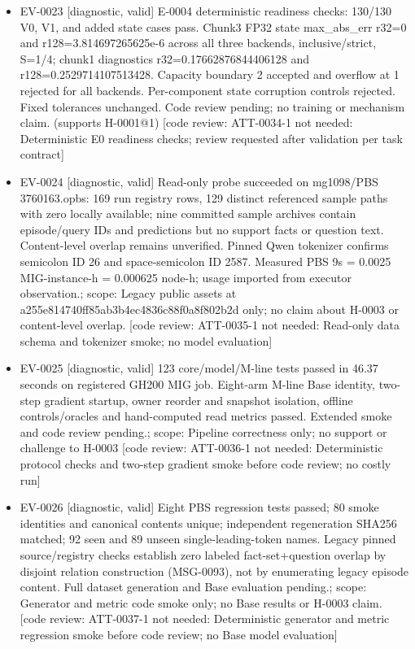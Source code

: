 \documentclass[11pt]{article}
\begin{document}
\begin{itemize}
\item EV-0023 [diagnostic, valid] E-0004 deterministic readiness checks: 130/130 V0, V1, and added state cases pass. Chunk3 FP32 state max\_abs\_err r32=0 and r128=3.814697265625e-6 across all three backends, inclusive/strict, S=1/4; chunk1 diagnostics r32=0.17662876844406128 and r128=0.2529714107513428. Capacity boundary 2 accepted and overflow at 1 rejected for all backends. Per-component state corruption controls rejected. Fixed tolerances unchanged. Code review pending; no training or mechanism claim. (supports H-0001@1) [code review: ATT-0034-1 not needed: Deterministic E0 readiness checks; review requested after validation per task contract]
\item EV-0024 [diagnostic, valid] Read-only probe succeeded on mg1098/PBS 3760163.opbs: 169 run registry rows, 129 distinct referenced sample paths with zero locally available; nine committed sample archives contain episode/query IDs and predictions but no support facts or question text. Content-level overlap remains unverified. Pinned Qwen tokenizer confirms semicolon ID 26 and space-semicolon ID 2587. Measured PBS 9s = 0.0025 MIG-instance-h = 0.000625 node-h; usage imported from executor observation.; scope: Legacy public assets at a255e814740ff85ab3b4ec4836c88f0a8f802b2d only; no claim about H-0003 or content-level overlap. [code review: ATT-0035-1 not needed: Read-only data schema and tokenizer smoke; no model evaluation]
\item EV-0025 [diagnostic, valid] 123 core/model/M-line tests passed in 46.37 seconds on registered GH200 MIG job. Eight-arm M-line Base identity, two-step gradient startup, owner reorder and snapshot isolation, offline controls/oracles and hand-computed read metrics passed. Extended smoke and code review pending.; scope: Pipeline correctness only; no support or challenge to H-0003 [code review: ATT-0036-1 not needed: Deterministic protocol checks and two-step gradient smoke before code review; no costly run]
\item EV-0026 [diagnostic, valid] Eight PBS regression tests passed; 80 smoke identities and canonical contents unique; independent regeneration SHA256 matched; 92 seen and 89 unseen single-leading-token names. Legacy pinned source/registry checks establish zero labeled fact-set+question overlap by disjoint relation construction (MSG-0093), not by enumerating legacy episode content. Full dataset generation and Base evaluation pending.; scope: Generator and metric code smoke only; no Base results or H-0003 claim. [code review: ATT-0037-1 not needed: Deterministic generator and metric regression smoke before code review; no Base model evaluation]

\end{itemize}
\end{document}
